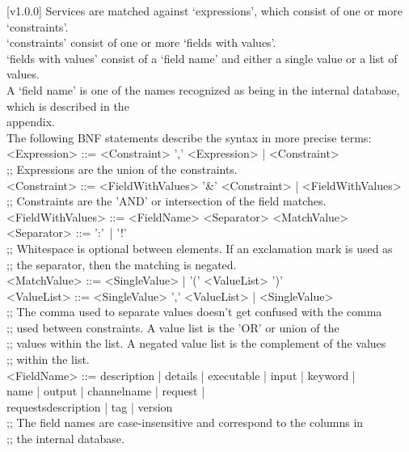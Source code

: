 [v1.0.0]
%
Services are matched against `expressions', which consist of one or more
`constraints'.\\
`constraints' consist of one or more `fields with values'.\\
`fields with values' consist of a `field name' and either a single value or a list of
values.\\
A `field name' is one of the names recognized as being in the internal database, which is
described in the\\
 appendix.\\

The following BNF statements describe the syntax in more precise terms:
\outputBegin{}
<Expression> ::= <Constraint> ',' <Expression> | <Constraint>\\
;; Expressions are the union of the constraints.\\

<Constraint> ::= <FieldWithValues> '\&' <Constraint> | <FieldWithValues>\\
;; Constraints are the 'AND' or intersection of the field matches.\\

<FieldWithValues> ::= <FieldName> <Separator> <MatchValue>\\
<Separator> ::= ':'\ | '!'\\
;; Whitespace is optional between elements. If an exclamation mark is used as\\
;; the separator, then the matching is negated.\\

<MatchValue> ::= <SingleValue> | '(' <ValueList> ')'\\
<ValueList> ::= <SingleValue> ',' <ValueList> | <SingleValue>\\
;; The comma used to separate values doesn't get confused with the comma\\
;; used between constraints. A value list is the 'OR' or union of the\\
;; values within the list. A negated value list is the complement of the values\\
;; within the list.\\

\settowidth{\uL}{<FieldName> ::= }%
<FieldName> ::= description | details | executable | input | keyword |\\
\hspace*{\uL}name | output | channelname | request |\\
\hspace*{\uL}requestsdescription | tag | version\\
;; The field names are case-insensitive and correspond to the columns in\\
;; the internal database.\\

